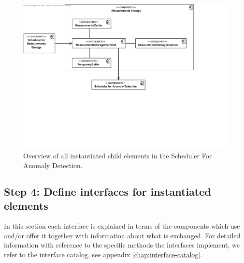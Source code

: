 \begin{figure}[H]
	\begin{centering}
		\includegraphics[width=\textwidth]{figs/add-it4-elements.pdf}
		\caption{Overview of all instantiated child elements in the Scheduler For
		Anomaly Detection.}
		\label{fig:it5/elements}
	\end{centering}
\end{figure}

\subsection{Step 4: Define interfaces for instantiated elements}
\label{add:it5/interfaces}

\npar In this section each interface is explained in terms of the components
which use and/or offer it together with information about what is exchanged. For
detailed information with reference to the specific methods the interfaces
implement, we refer to the interface catalog, see appendix
\ref{chap:interface-catalog}.

% 

